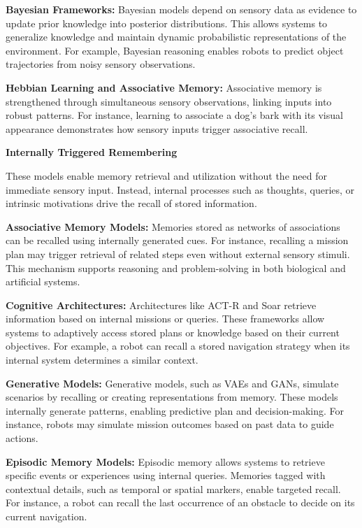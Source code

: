 \documentclass{book}
\providecommand{\ProjectDeepHeading}[2]{%
    \par\medskip\noindent\textbf{#2}\par\smallskip
}
\begin{document}
            \textbf{Bayesian Frameworks:} Bayesian models depend on sensory data as evidence to update prior knowledge into posterior distributions. This allows systems to generalize knowledge and maintain dynamic probabilistic representations of the environment. For example, Bayesian reasoning enables robots to predict object trajectories from noisy sensory observations. 

            \textbf{Hebbian Learning and Associative Memory:} Associative memory is strengthened through simultaneous sensory observations, linking inputs into robust patterns. For instance, learning to associate a dog’s bark with its visual appearance demonstrates how sensory inputs trigger associative recall. 

    \ProjectDeepHeading{7}{Internally Triggered Remembering}
    These models enable memory retrieval and utilization without the need for immediate sensory input. Instead, internal processes such as thoughts, queries, or intrinsic motivations drive the recall of stored information.

        \textbf{Associative Memory Models:} Memories stored as networks of associations can be recalled using internally generated cues. For instance, recalling a mission plan may trigger retrieval of related steps even without external sensory stimuli. This mechanism supports reasoning and problem-solving in both biological and artificial systems.

        \textbf{Cognitive Architectures:} Architectures like ACT-R and Soar retrieve information based on internal missions or queries. These frameworks allow systems to adaptively access stored plans or knowledge based on their current objectives. For example, a robot can recall a stored navigation strategy when its internal system determines a similar context.

        \textbf{Generative Models:} Generative models, such as VAEs and GANs, simulate scenarios by recalling or creating representations from memory. These models internally generate patterns, enabling predictive plan and decision-making. For instance, robots may simulate mission outcomes based on past data to guide actions.

        \textbf{Episodic Memory Models:} Episodic memory allows systems to retrieve specific events or experiences using internal queries. Memories tagged with contextual details, such as temporal or spatial markers, enable targeted recall. For instance, a robot can recall the last occurrence of an obstacle to decide on its current navigation. 
\end{document}
